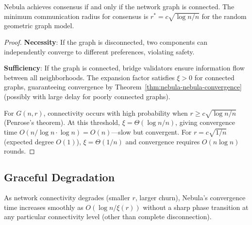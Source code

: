 \begin{lemma}
\label{lem:nebula-connectivity}
Nebula achieves consensus if and only if the network graph is connected. The minimum
communication radius for consensus is $r^* = c\sqrt{\log n / n}$ for the random
geometric graph model.
\end{lemma}

\begin{proof}
\textbf{Necessity}: If the graph is disconnected, two components can independently
converge to different preferences, violating safety.

\textbf{Sufficiency}: If the graph is connected, bridge validators ensure information
flow between all neighborhoods. The expansion factor satisfies $\xi > 0$ for connected
graphs, guaranteeing convergence by Theorem~\ref{thm:nebula-nebula-convergence} (possibly with
large delay for poorly connected graphs).

For $G(n, r)$, connectivity occurs with high probability when $r \geq c\sqrt{\log n / n}$
(Penrose's theorem). At this threshold, $\xi = \Theta(\log n / n)$, giving convergence
time $O(n / \log n \cdot \log n) = O(n)$---slow but convergent. For $r = c\sqrt{1/n}$
(expected degree $O(1)$), $\xi = \Theta(1/n)$ and convergence requires $O(n \log n)$ rounds.
\end{proof}

\subsection{Graceful Degradation}

\begin{corollary}
\label{cor:graceful}
As network connectivity degrades (smaller $r$, larger churn), Nebula's convergence
time increases smoothly as $O(\log n / \xi(r))$ without a sharp phase transition
at any particular connectivity level (other than complete disconnection).
\end{corollary}

